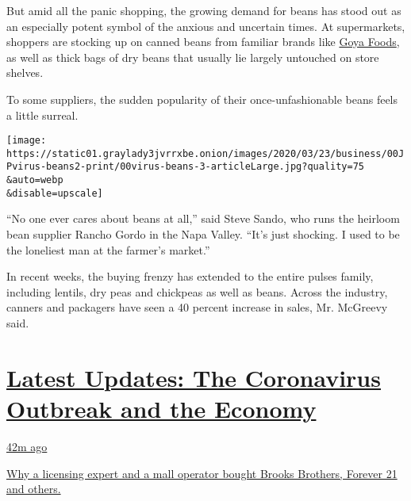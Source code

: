 But amid all the panic shopping, the growing demand for beans has stood
out as an especially potent symbol of the anxious and uncertain times.
At supermarkets, shoppers are stocking up on canned beans from familiar
brands like
\href{https://www.nytimes3xbfgragh.onion/2020/07/10/business/goya-boycott.html}{Goya
Foods}, as well as thick bags of dry beans that usually lie largely
untouched on store shelves.

To some suppliers, the sudden popularity of their once-unfashionable
beans feels a little surreal.

\texttt{[image: https://static01.graylady3jvrrxbe.onion/images/2020/03/23/business/00JPvirus-beans2-print/00virus-beans-3-articleLarge.jpg?quality=75\\\&auto=webp\\\&disable=upscale]}

``No one ever cares about beans at all,'' said Steve Sando, who runs the
heirloom bean supplier Rancho Gordo in the Napa Valley. ``It's just
shocking. I used to be the loneliest man at the farmer's market.''

In recent weeks, the buying frenzy has extended to the entire pulses
family, including lentils, dry peas and chickpeas as well as beans.
Across the industry, canners and packagers have seen a 40 percent
increase in sales, Mr. McGreevy said.

\hypertarget{latest-updates-the-coronavirus-outbreak-and-the-economy}{%
\section{\texorpdfstring{\href{https://www.nytimes3xbfgragh.onion/live/2020/09/09/business/stock-market-today-coronavirus?action=click\&pgtype=Article\&state=default\&region=MAIN_CONTENT_1\&context=storylines_live_updates}{Latest
Updates: The Coronavirus Outbreak and the
Economy}}{Latest Updates: The Coronavirus Outbreak and the Economy}}\label{latest-updates-the-coronavirus-outbreak-and-the-economy}}

\href{https://www.nytimes3xbfgragh.onion/live/2020/09/09/business/stock-market-today-coronavirus?action=click\&pgtype=Article\&state=default\&region=MAIN_CONTENT_1\&context=storylines_live_updates\#why-a-licensing-expert-and-a-mall-operator-bought-brooks-brothers-forever-21-and-others}{42m
ago}

\href{https://www.nytimes3xbfgragh.onion/live/2020/09/09/business/stock-market-today-coronavirus?action=click\&pgtype=Article\&state=default\&region=MAIN_CONTENT_1\&context=storylines_live_updates\#why-a-licensing-expert-and-a-mall-operator-bought-brooks-brothers-forever-21-and-others}{Why
a licensing expert and a mall operator bought Brooks Brothers, Forever
21 and others.}

